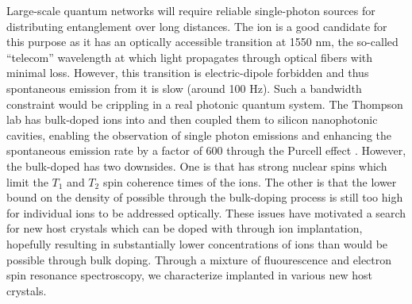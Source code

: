 Large-scale quantum networks will require reliable single-photon sources for distributing entanglement over long distances. The \erbium ion is a good candidate for this purpose as it has an optically accessible transition at 1550 nm, the so-called ``telecom'' wavelength at which light propagates through optical fibers with minimal loss. However, this transition is electric-dipole forbidden and thus spontaneous emission from it is slow (around 100 Hz).
Such a bandwidth constraint would be crippling in a real photonic quantum system. The Thompson lab has bulk-doped \erbium ions into \YSO and then coupled them to silicon nanophotonic cavities, enabling the observation of single photon emissions and enhancing the spontaneous emission rate by a factor of 600 through the Purcell effect \cite{Dibos2017}.
However, the bulk-doped \ErYSO has two downsides. One is that \YSO has strong nuclear spins which limit the  $T_{1}$ and $T_{2}$ spin coherence times of the \erbium ions. The other is that the lower bound on the density of \erbium possible through the bulk-doping process is still too high for individual \erbium ions to be addressed optically.
These issues have motivated a search for new host crystals which can be doped with \erbium through ion implantation, hopefully resulting in substantially lower concentrations of \erbium ions than would be possible through bulk doping. Through a mixture of fluourescence and electron spin resonance spectroscopy, we characterize implanted \erbium in various new host crystals. 